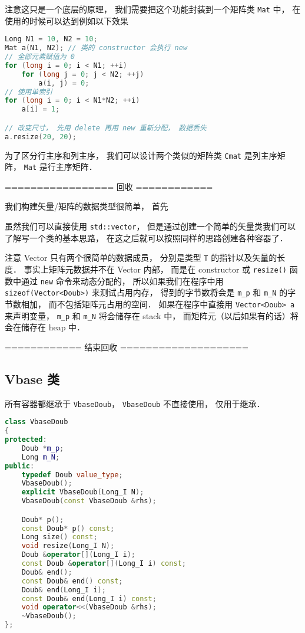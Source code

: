 注意这只是一个底层的原理， 我们需要把这个功能封装到一个矩阵类 \verb|Mat| 中， 在使用的时候可以达到例如以下效果
\begin{lstlisting}[language=cpp]
Long N1 = 10, N2 = 10;
Mat a(N1, N2); // 类的 constructor 会执行 new
// 全部元素赋值为 0
for (long i = 0; i < N1; ++i)
    for (long j = 0; j < N2; ++j)
        a(i, j) = 0;
// 使用单索引
for (long i = 0; i < N1*N2; ++i)
    a[i] = 1;

// 改变尺寸， 先用 delete 再用 new 重新分配， 数据丢失
a.resize(20, 20);
\end{lstlisting}
为了区分行主序和列主序， 我们可以设计两个类似的矩阵类 \verb|Cmat| 是列主序矩阵， \verb|Mat| 是行主序矩阵．

================= 回收 ============

我们构建矢量/矩阵的数据类型很简单， 首先

虽然我们可以直接使用 \verb|std::vector|， 但是通过创建一个简单的矢量类我们可以了解写一个类的基本思路， 在这之后就可以按照同样的思路创建各种容器了．

注意 Vector 只有两个很简单的数据成员， 分别是类型 \verb|T| 的指针以及矢量的长度． 事实上矩阵元数据并不在 Vector 内部， 而是在 constructor 或 \verb|resize()| 函数中通过 \verb|new| 命令来动态分配的， 所以如果我们在程序中用 \verb|sizeof(Vector<Doub>)| 来测试占用内存， 得到的字节数将会是 \verb|m_p| 和 \verb|m_N| 的字节数相加， 而不包括矩阵元占用的空间． 如果在程序中直接用 \verb|Vector<Doub> a| 来声明变量， \verb|m_p| 和 \verb|m_N| 将会储存在 stack 中， 而矩阵元（以后如果有的话）将会在储存在 heap 中．

============ 结束回收 ====================

\subsection{Vbase 类}
所有容器都继承于 \verb|VbaseDoub|， \verb|VbaseDoub| 不直接使用， 仅用于继承．
\begin{lstlisting}[language=cpp]
class VbaseDoub
{
protected:
    Doub *m_p;
    Long m_N;
public:
    typedef Doub value_type;
    VbaseDoub();
    explicit VbaseDoub(Long_I N);
    VbaseDoub(const VbaseDoub &rhs);

    Doub* p();
    const Doub* p() const;
    Long size() const;
    void resize(Long_I N);
    Doub &operator[](Long_I i);
    const Doub &operator[](Long_I i) const;
    Doub& end();
    const Doub& end() const;
    Doub& end(Long_I i);
    const Doub& end(Long_I i) const;
    void operator<<(VbaseDoub &rhs);
    ~VbaseDoub();
};
\end{lstlisting}

